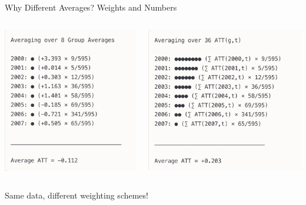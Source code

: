 \documentclass{beamer}
\begin{document}
\begin{frame}{Why Different Averages? Weights and Numbers}
\begin{columns}
\begin{column}{0.45\textwidth}
\centering
\includegraphics[width=\textwidth]{./lecture_includes/average1.png}
\end{column}
\begin{column}{0.51\textwidth}
\centering
\includegraphics[width=\textwidth]{./lecture_includes/average2.png}
\end{column}
\end{columns}

\vspace{0.5cm}
\begin{center}
\large
Same data, different weighting schemes!
\end{center}
\end{frame}
\end{document}
